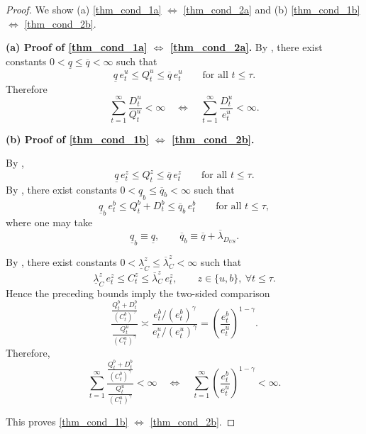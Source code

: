 \documentclass[12pt]{article}
\theoremstyle{plain}
\begin{document}
\begin{proof}
We show (a) \eqref{thm_cond_1a} $\Longleftrightarrow$ \eqref{thm_cond_2a} and
(b) \eqref{thm_cond_1b} $\Longleftrightarrow$ \eqref{thm_cond_2b}. 

\medskip
\noindent\textbf{(a) Proof of \eqref{thm_cond_1a} $\Longleftrightarrow$ \eqref{thm_cond_2a}.}
By , there exist constants $0<\underline q\le \overline q<\infty$ such that
\[
\underline q\,e_{t}^u\le Q_{t}^u\le \overline q\,e_{t}^u
\qquad\text{for all }t\le\tau.
\]
Therefore
\[
\sum_{t=1}^\infty \frac{D_t^u}{Q_t^u}<\infty
\quad\Longleftrightarrow\quad
\sum_{t=1}^\infty \frac{D_t^u}{e_{t}^u}<\infty.
\]

\medskip
\noindent\textbf{(b) Proof of \eqref{thm_cond_1b} $\Longleftrightarrow$ \eqref{thm_cond_2b}.}

By ,
\[
\underline q\,e_{t}^z\le Q_t^z\le \overline q\,e_{t}^z
\qquad\text{for all }t\le\tau.
\]
By , there exist constants $0<\underline q_b\le \overline q_b<\infty$ such that
\[
\underline q_b\,e_{t}^b
\le
Q_t^b+D_t^b
\le
\overline q_b\,e_{t}^b
\qquad\text{for all }t\le\tau,
\]
where one may take
\[
\underline q_b\equiv \underline q,
\qquad
\overline q_b\equiv \overline q+\overline\lambda_{D_{US}}.
\]

By
, there exist constants
$0<\underline\lambda^z_C\le \overline\lambda^z_C<\infty$ such that
\[
\underline\lambda^z_C\,e_{t}^z
\le
C_t^z
\le
\overline\lambda^z_C\,e_{t}^z,
\qquad
z\in\{u,b\},\ \forall t\le\tau.
\]
Hence the preceding bounds imply the two-sided comparison
\[
\frac{
\frac{Q^b_t+D^b_t}{(C^b_t)^\gamma}
}{
\frac{Q^u_t}{(C^u_t)^\gamma}
}
\asymp
\frac{e^b_t/(e^b_t)^\gamma}{e^u_t/(e^u_t)^\gamma}
=
\left(\frac{e^b_t}{e^u_t}\right)^{1-\gamma}.
\]
Therefore,
\[
\sum_{t=1}^{\infty}
\frac{
\frac{Q^b_t+D^b_t}{(C^b_t)^\gamma}
}{
\frac{Q^u_t}{(C^u_t)^\gamma}
}
<\infty
\quad\Longleftrightarrow\quad
\sum_{t=1}^{\infty}
\left(\frac{e^b_t}{e^u_t}\right)^{1-\gamma}
<\infty.
\]

This proves \eqref{thm_cond_1b} $\Longleftrightarrow$ \eqref{thm_cond_2b}.
\end{proof}



\appendix


 
\end{document}
